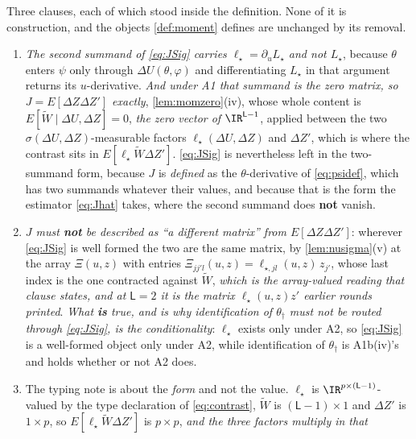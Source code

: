 \begin{remark}\label{rem:momentread}
Three clauses, each of which stood inside the definition. None of it is construction, and the
objects \cref{def:moment} defines are unchanged by its removal.
\begin{enumerate}
\item[(1)] \emph{The second summand of \eqref{eq:JSig} carries $\ell_\star=\partial_uL_\star$ and not
$L_\star$}, because $\theta$ enters $\psi$ only through $\Delta U(\theta,\varphi)$ and differentiating
$L_\star$ in that argument returns its $u$-derivative. \emph{And under A1 that summand is the zero matrix,
so $J=E[\Delta Z\Delta Z']$ exactly}, \cref{lem:momzero}\textup{(iv)}, whose whole content is
$E[\widetilde W\mid\Delta U,\Delta Z]=0$, \emph{the zero vector of $\IR^{\mathsf L-1}$}, applied
between the two $\sigma(\Delta U,\Delta Z)$-measurable factors
$\ell_\star(\Delta U,\Delta Z)$ and $\Delta Z'$, which is where the contrast sits in
$E[\ell_\star\widetilde W\Delta Z']$. \eqref{eq:JSig} is nevertheless left in the two-summand form,
because $J$ is \emph{defined} as the $\theta$-derivative of \eqref{eq:psidef}, which has two summands
whatever their values, and because that is the form the estimator \eqref{eq:Jhat} takes, where the
second summand does \textbf{not} vanish.
\item[(2)] \emph{$J$ must \textbf{not} be described as ``a different matrix'' from
$E[\Delta Z\Delta Z']$}: wherever \eqref{eq:JSig} is well formed the two are the same matrix, by
\cref{lem:nusigma}\textup{(v)} at the array $\Xi(u,z)$ with entries
$\Xi_{jj'l}(u,z)=\ell_{\star,jl}(u,z)\,z_{j'}$, whose last index is the one contracted against
$\widetilde W$, \emph{which is the array-valued reading that clause states, and at $\mathsf L=2$ it is
the matrix $\ell_\star(u,z)z'$ earlier rounds printed}. \emph{What \textbf{is} true, and is why
identification of $\theta_\dagger$ must not be routed through \eqref{eq:JSig}, is the conditionality}:
$\ell_\star$ exists only under A2, so \eqref{eq:JSig} is a well-formed object only under A2, while
identification of $\theta_\dagger$ is A1b(iv)'s and holds whether or not A2 does.
\item[(3)] The typing note is about the \emph{form} and not the value. $\ell_\star$ is
$\IR^{p\times(\mathsf L-1)}$-valued by the type declaration of \eqref{eq:contrast}, $\widetilde W$ is
$(\mathsf L-1)\times1$ and $\Delta Z'$ is $1\times p$, so
$E[\ell_\star\widetilde W\Delta Z']$ is $p\times p$, \emph{and the three factors multiply in that
}
\end{enumerate}
\end{remark}
